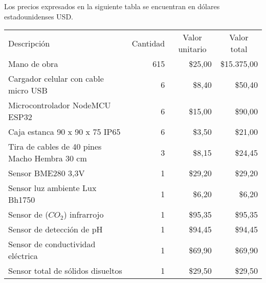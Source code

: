 Los precios expresados en la siguiente tabla se encuentran en dólares estadounidenses USD.

\begin{table}[htpb]
	\centering
	\begin{tabularx}{\linewidth}{@{}|X|c|r|r|@{}}
		\hline
		\rowcolor[HTML]{C0C0C0}
		\multicolumn{4}{|c|}{\cellcolor[HTML]{C0C0C0}COSTOS DIRECTOS}   \\ \hline
		\rowcolor[HTML]{C0C0C0}
		Descripción & \multicolumn{1}{c|}{\cellcolor[HTML]{C0C0C0}Cantidad} & 
		\multicolumn{1}{c|}{\cellcolor[HTML]{C0C0C0}Valor unitario} &
		\multicolumn{1}{c|}{\cellcolor[HTML]{C0C0C0}Valor total}\\ \hline
		Mano de obra & 
		\multicolumn{1}{r|}{615} & \multicolumn{1}{r|}{\$25,00} & \multicolumn{1}{r|}{\$15.375,00} \\ \hline
		Cargador celular con cable micro USB & 
		\multicolumn{1}{r|}{6} & \multicolumn{1}{r|}{\$8,40} & \multicolumn{1}{r|}{\$50,40} \\ \hline
		Microcontrolador NodeMCU ESP32 & 
		\multicolumn{1}{r|}{6} & \multicolumn{1}{r|}{\$15,00} & \multicolumn{1}{r|}{\$90,00} \\ \hline
		Caja estanca 90 x 90 x 75 IP65 & 
		\multicolumn{1}{r|}{6} & \multicolumn{1}{r|}{\$3,50} & \multicolumn{1}{r|}{\$21,00} \\ \hline
		Tira de cables de 40 pines Macho Hembra 30 cm & 
		\multicolumn{1}{r|}{3} & \multicolumn{1}{r|}{\$8,15} & \multicolumn{1}{r|}{\$24,45} \\ \hline
		Sensor BME280 3,3V & 
		\multicolumn{1}{r|}{1} & \multicolumn{1}{r|}{\$29,20} & \multicolumn{1}{r|}{\$29,20} \\ \hline
		Sensor luz ambiente Lux Bh1750 & 
		\multicolumn{1}{r|}{1} & \multicolumn{1}{r|}{\$6,20} & \multicolumn{1}{r|}{\$6,20} \\ \hline
		Sensor de ($CO_2$) infrarrojo  & 
		\multicolumn{1}{r|}{1} & \multicolumn{1}{r|}{\$95,35} & \multicolumn{1}{r|}{\$95,35} \\ \hline
		Sensor de detección de pH  & 
		\multicolumn{1}{r|}{1} & \multicolumn{1}{r|}{\$94,45} & \multicolumn{1}{r|}{\$94,45} \\ \hline
		Sensor de conductividad eléctrica   & 
		\multicolumn{1}{r|}{1} & \multicolumn{1}{r|}{\$69,90} & \multicolumn{1}{r|}{\$69,90} \\ \hline
		Sensor total de sólidos disueltos   & 
		\multicolumn{1}{r|}{1} & \multicolumn{1}{r|}{\$29,50} & \multicolumn{1}{r|}{\$29,50} \\ \hline

\end{tabularx}
\end{table}
